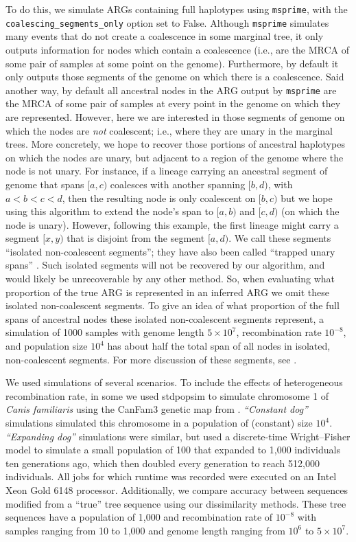 \documentclass[10pt,twoside,lineno]{gsajnl}
\newcommand{\msprime}{\texttt{msprime}}
\begin{document}
To do this, we simulate ARGs containing full haplotypes using \msprime \citep{kelleher2016efficient,baumdicker2021efficient},
with the \texttt{coalescing\_segments\_only} option set to False.
Although \msprime{} simulates many events that do not create a coalescence in some marginal tree,
it only outputs information for nodes which contain a coalescence
(i.e., are the MRCA of some pair of samples at some point on the genome).
Furthermore, by default it only outputs those segments of the genome
on which there is a coalescence.
Said another way, by default all ancestral nodes in the ARG
output by \msprime{} are the MRCA of some pair of samples at every point in the genome
on which they are represented.
However, here we are interested in those segments of genome
on which the nodes are \emph{not} coalescent;
i.e., where they are unary in the marginal trees.
More concretely, we hope to recover those portions of ancestral haplotypes
on which the nodes are unary, but adjacent to a region of the genome where the node is not unary.
For instance, if a lineage carrying an ancestral segment of genome that spans $[a, c)$
coalesces with another spanning $[b, d)$, with $a < b < c < d$,
then the resulting node is only coalescent on $[b, c)$ but we hope using this algorithm
to extend the node's span to $[a, b)$ and $[c, d)$
(on which the node is unary).
However, following this example, the first lineage might carry a segment $[x, y)$
that is disjoint from the segment $[a, d)$.
We call these segments ``isolated non-coalescent segments'';
they have also been called ``trapped unary spans'' \citep[by][]{wong2024general}.
Such isolated segments will not be recovered by our algorithm,
and would likely be unrecoverable by any other method.
So, when evaluating what proportion of the true ARG is represented in an inferred ARG
we omit these isolated non-coalescent segments.
To give an idea of what proportion of the full spans of ancestral nodes
these isolated non-coalescent segments represent,
a simulation of 1000 samples
with genome length $5\times 10^7$, recombination rate $10^{-8}$, and population size $10^4$
has about half the total span of all nodes in isolated, non-coalescent segments.
For more discussion of these segments, see \citet{baumdicker2021efficient}.

We used simulations of several scenarios.
To include the effects of heterogeneous recombination rate,
in some we used stdpopsim \citep{adrion2020stdpopsim} 
to simulate chromosome 1 of \textit{Canis familiaris}
using the CanFam3 genetic map from \citet{campbell2016}.
\emph{``Constant dog''} simulations simulated this chromosome in a 
population of (constant) size $10^4$.
\emph{``Expanding dog''} simulations were similar, but
used a discrete-time Wright--Fisher model to simulate
a small population of 100 that expanded to 1,000 individuals ten generations ago,
which then doubled every generation to reach 512,000 individuals.
All jobs for which runtime was recorded were executed on an Intel Xeon Gold 6148 processor.
 Additionally, we compare accuracy between sequences modified from a ``true'' tree sequence
 using our dissimilarity methods. 
 These tree sequences have a population of 1,000 and recombination rate of $10^{-8}$ with samples ranging from 10 to 1,000 and genome length ranging from $10^6$ to $5\times 10^7$.
\end{document}
